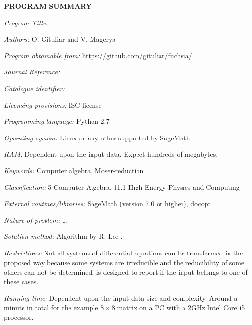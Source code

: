 {\bf PROGRAM SUMMARY}

\begin{small}
\noindent

{\em Program Title:}
    \fuchsia{}

{\em Authors:}
    O. Gituliar and V. Magerya

{\em Program obtainable from:}
    \url{https://github.com/gituliar/fuchsia/}

{\em Journal Reference:}

{\em Catalogue identifier:}

{\em Licensing provisions:}
    ISC license

{\em Programming language:}
    Python 2.7

{\em Operating system:}
    Linux or any other supported by SageMath

{\em RAM:}
    Dependent upon the input data. Expect hundreds of megabytes.

{\em Keywords:}
    Computer algebra, Moser-reduction

{\em Classification:}
    5 Computer Algebra, 11.1 High Energy Physics and Computing

{\em External routines/libraries:}
    \href{http://www.sagemath.org/}{SageMath} (version 7.0 or higher),
    \href{https://pypi.python.org/pypi/docopt/}{docopt}

{\em Nature of problem:}
    \ldots{}

{\em Solution method:}
    Algorithm by R. Lee \cite{Lee15}.

{\em Restrictions:}
    Not all systems of differential equations can be transformed
    in the proposed way because some systems are irreducible
    and the reducibility of some others can not be determined.
    \fuchsia{} is designed to report if the input belongs to
    one of these cases.

{\em Running time:}
    Dependent upon the input data size and complexity. Around
    a minute in total for the example $8\times8$ matrix on a PC
    with a 2GHz Intel Core i5 processor.

\end{small}
